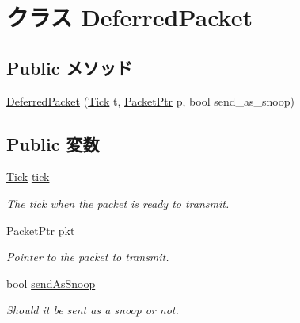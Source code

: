 \hypertarget{classPacketQueue_1_1DeferredPacket}{
\section{クラス DeferredPacket}
\label{classPacketQueue_1_1DeferredPacket}
}
\subsection*{Public メソッド}
\begin{DoxyCompactItemize}
\item 
\hyperlink{classPacketQueue_1_1DeferredPacket_aeb2bea370e6bbb7c59fd8c65f2089ad8}{DeferredPacket} (\hyperlink{base_2types_8hh_a5c8ed81b7d238c9083e1037ba6d61643}{Tick} t, \hyperlink{classPacket}{PacketPtr} p, bool send\_\-as\_\-snoop)
\end{DoxyCompactItemize}
\subsection*{Public 変数}
\begin{DoxyCompactItemize}
\item 
\hyperlink{base_2types_8hh_a5c8ed81b7d238c9083e1037ba6d61643}{Tick} \hyperlink{classPacketQueue_1_1DeferredPacket_a4daae57fbf09ee5423d123f5ce330e92}{tick}
\begin{DoxyCompactList}\small\item\em The tick when the packet is ready to transmit. \item\end{DoxyCompactList}\item 
\hyperlink{classPacket}{PacketPtr} \hyperlink{classPacketQueue_1_1DeferredPacket_a3a891bc2a0fcbe6be5297077d94e2df7}{pkt}
\begin{DoxyCompactList}\small\item\em Pointer to the packet to transmit. \item\end{DoxyCompactList}\item 
bool \hyperlink{classPacketQueue_1_1DeferredPacket_af114b714a8c67e5b1c91da7937ae6227}{sendAsSnoop}
\begin{DoxyCompactList}\small\item\em Should it be sent as a snoop or not. \item\end{DoxyCompactList}\end{DoxyCompactItemize}


